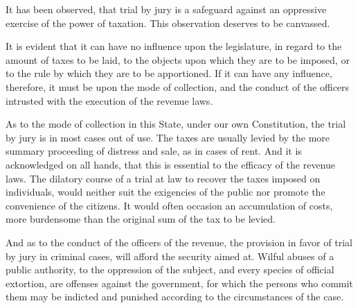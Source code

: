 It has been observed, that trial by jury is a safeguard against an oppressive exercise of the power of taxation. This observation deserves to be canvassed.

It is evident that it can have no influence upon the legislature, in regard to the amount of taxes to be laid, to the objects upon which they are to be imposed, or to the rule by which they are to be apportioned. If it can have any influence, therefore, it must be upon the mode of collection, and the conduct of the officers intrusted with the execution of the revenue laws.

As to the mode of collection in this State, under our own Constitution, the trial by jury is in most cases out of use. The taxes are usually levied by the more summary proceeding of distress and sale, as in cases of rent. And it is acknowledged on all hands, that this is essential to the efficacy of the revenue laws. The dilatory course of a trial at law to recover the taxes imposed on individuals, would neither suit the exigencies of the public nor promote the convenience of the citizens. It would often occasion an accumulation of costs, more burdensome than the original sum of the tax to be levied.

And as to the conduct of the officers of the revenue, the provision in favor of trial by jury in criminal cases, will afford the security aimed at. Wilful abuses of a public authority, to the oppression of the subject, and every species of official extortion, are offenses against the government, for which the persons who commit them may be indicted and punished according to the circumstances of the case.

